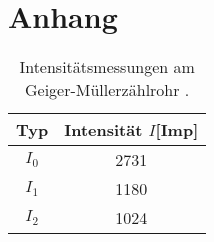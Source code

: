 \section{Anhang}

\begin{table}
\centering
\caption{Intensitätsmessungen am Geiger-Müllerzählrohr \cite{hinweis}.}
\label{tab:idky}
\begin{tabular}{c c}
    \toprule
    Typ & Intensität $I$[Imp] \\
    \midrule
    $I_{0}$  &   2731   \\
$I_{1}$  &   1180   \\
    $I_{2}$  &   1024   \\
    \bottomrule
\end{tabular}
\end{table}


